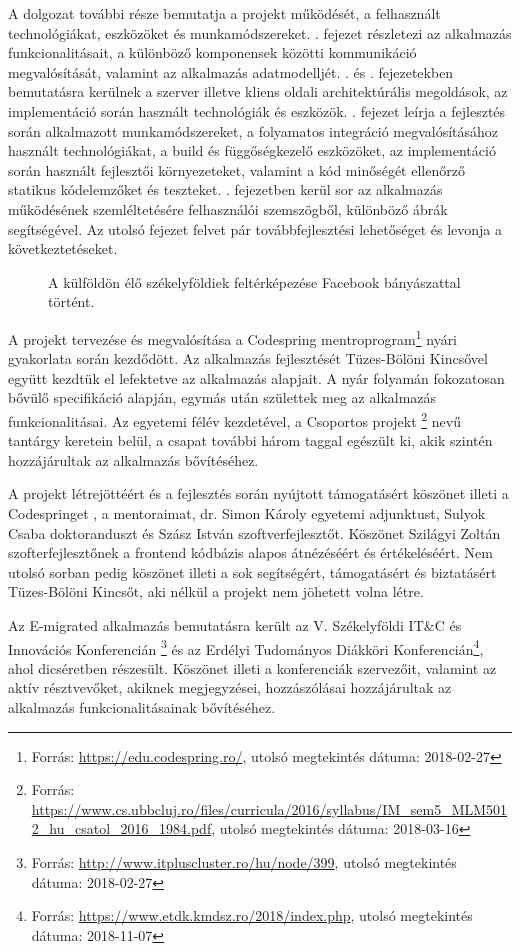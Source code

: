 A dolgozat további része bemutatja a projekt működését, a felhasznált technológiákat, eszközöket és munkamódszereket.  . fejezet részletezi az alkalmazás funkcionalitásait, a különböző komponensek közötti kommunikáció megvalósítását, valamint az alkalmazás adatmodelljét.  . és . fejezetekben bemutatásra kerülnek a szerver illetve kliens oldali architektúrális megoldások, az implementáció során használt technológiák és eszközök. . fejezet leírja a fejlesztés során alkalmazott munkamódszereket,  a folyamatos integráció megvalósításához használt technológiákat, a build és függőségkezelő eszközöket, az implementáció során használt fejlesztői környezeteket, valamint a kód minőségét ellenőrző statikus kódelemzőket és teszteket. . fejezetben kerül sor az alkalmazás működésének szemléltetésére felhasználói szemszögből, különböző ábrák segítségével. Az utolsó fejezet felvet pár továbbfejlesztési lehetőséget és levonja a következtetéseket. 
\begin{figure}
  \centering
  \caption{A külföldön élő székelyföldiek feltérképezése Facebook bányászattal történt.}
  \label{fig:szekely_diaszpora}
\end{figure}

A projekt tervezése és megvalósítása a Codespring mentroprogram\footnote{Forrás: \url{https://edu.codespring.ro/}, utolsó megtekintés dátuma: 2018-02-27} nyári gyakorlata során kezdődött. Az alkalmazás fejlesztését Tüzes-Bölöni Kincsővel együtt kezdtük el lefektetve az alkalmazás alapjait. A nyár folyamán fokozatosan bővülő specifikáció alapján, egymás után születtek meg az alkalmazás funkcionalitásai. Az egyetemi félév kezdetével, a Csoportos projekt \footnote{Forrás: \url{https://www.cs.ubbcluj.ro/files/curricula/2016/syllabus/IM_sem5_MLM5012_hu_csatol_2016_1984.pdf}, utolsó megtekintés dátuma: 2018-03-16} nevű tantárgy keretein belül, a csapat további három taggal egészült ki, akik szintén hozzájárultak az alkalmazás bővítéséhez. 

A projekt létrejöttéért és a fejlesztés során nyújtott támogatásért köszönet illeti a Codespringet , a mentoraimat, dr. Simon Károly egyetemi adjunktust, Sulyok Csaba doktoranduszt és Szász István szoftverfejlesztőt. Köszönet Szilágyi Zoltán szofterfejlesztőnek a frontend kódbázis alapos átnézéséért és értékeléséért. Nem utolsó sorban pedig köszönet illeti a sok segítségért, támogatásért és biztatásért Tüzes-Bölöni Kincsőt, aki nélkül a projekt nem jöhetett volna létre. 

Az E-migrated alkalmazás bemutatásra került az V. Székelyföldi IT\&C és Innovációs Konferencián \footnote{Forrás: \url{http://www.itpluscluster.ro/hu/node/399}, utolsó megtekintés dátuma: 2018-02-27} és az Erdélyi Tudományos Diákköri Konferencián\footnote{Forrás: \url{https://www.etdk.kmdsz.ro/2018/index.php}, utolsó megtekintés dátuma: 2018-11-07}, ahol dicséretben részesült. Köszönet illeti a konferenciák szervezőit, valamint az aktív résztvevőket, akiknek megjegyzései, hozzászólásai hozzájárultak az alkalmazás funkcionalitásainak bővítéséhez. 


